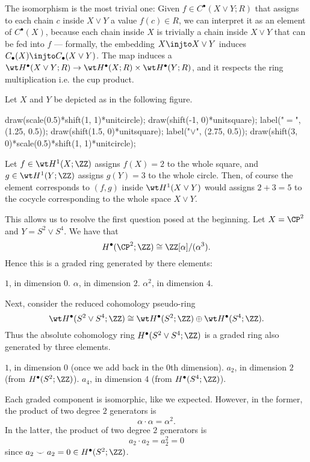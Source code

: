 The isomorphism is the most trivial one:
Given $f \in C^\bullet(X \vee Y; R)$ that assigns to each chain $c$ inside $X \vee Y$ a value
$f(c) \in R$, we can interpret it as an element of $C^\bullet(X)$, because each chain inside $X$ is
trivially a chain inside $X \vee Y$ that can be fed into $f$ ---
formally, the embedding $X \injto X \vee Y$ induces
$C_\bullet(X) \injto C_\bullet(X \vee Y)$. The map induces a $\wt H^\bullet(X \vee Y; R)
\to \wt H^\bullet(X; R) \times \wt H^\bullet(Y; R)$, and it respects the ring multiplication i.e.
the cup product.

\begin{example}
	Let $X$ and $Y$ be depicted as in the following figure.
	\begin{center}
	\begin{asy}
		draw(scale(0.5)*shift(1, 1)*unitcircle);
		draw(shift(-1, 0)*unitsquare);
		label("$=$", (1.25, 0.5));
		draw(shift(1.5, 0)*unitsquare);
		label("$\vee$", (2.75, 0.5));
		draw(shift(3, 0)*scale(0.5)*shift(1, 1)*unitcircle);
	\end{asy}
	\end{center}
	Let $f \in \wt H^1(X; \ZZ)$ assigns $f(X) = 2$ to the whole square, and
	$g \in \wt H^1(Y; \ZZ)$ assigns $g(Y) = 3$ to the whole circle.
	Then, of course the element corresponds to $(f, g)$ inside $\wt H^1(X \vee Y)$ would assigns
	$2 + 3 = 5$ to the cocycle corresponding to the whole space $X \vee Y$.
\end{example}

This allows us to resolve the first question posed at the beginning.
Let $X = \CP^2$ and $Y = S^2 \vee S^4$.
We have that
\[ H^\bullet(\CP^2; \ZZ) \cong \ZZ[\alpha] / (\alpha^3). \]
Hence this is a graded ring generated by there elements:
\begin{itemize}
	\ii $1$, in dimension $0$.
	\ii $\alpha$, in dimension $2$.
	\ii $\alpha^2$, in dimension $4$.
\end{itemize}
Next, consider the reduced cohomology pseudo-ring
\[ \wt H^\bullet(S^2 \vee S^4; \ZZ) \cong
	\wt H^\bullet(S^2; \ZZ)
	\oplus \wt H^\bullet(S^4 ; \ZZ).
\]
Thus the absolute cohomology ring $H^\bullet(S^2 \vee S^4 ; \ZZ)$
is a graded ring also generated by three elements.
\begin{itemize}
	\ii $1$, in dimension $0$ (once we add back in the $0$th dimension).
	\ii $a_2$, in dimension $2$ (from $H^\bullet(S^2 ; \ZZ)$).
	\ii $a_4$, in dimension $4$ (from $H^\bullet(S^4 ; \ZZ)$).
\end{itemize}
Each graded component is isomorphic, like we expected.
However, in the former, the product of two degree $2$ generators is
\[ \alpha \cdot \alpha = \alpha^2. \]
In the latter, the product of two degree $2$ generators is
\[ a_2 \cdot a_2 = a_2^2 = 0 \]
since $a_2 \smile a_2 = 0 \in H^\bullet(S^2; \ZZ)$.

